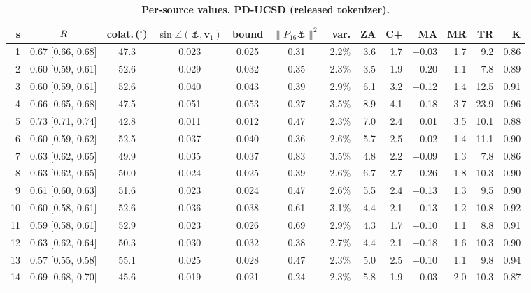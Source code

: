 \begin{table}[p]
\renewcommand{\baselinestretch}{1}
\caption{{\bf Per-source values, PD-UCSD (released tokenizer).}}
\label{tab:supp-pd_ucsd}
\centering\scriptsize
\setlength{\tabcolsep}{2.5pt}
\begin{tabular}{rcccccrrrrrrr}
\toprule
\textbf{s} & $\bar{R}$ & \textbf{colat.}\,($^\circ$) & $\sin\angle(\anchor,\bm{v}_1)$ & \textbf{bound} & $\|P_{16}\anchor\|^2$ & \textbf{var.} & \textbf{ZA} & \textbf{C+} & \textbf{MA} & \textbf{MR} & \textbf{TR} & \textbf{K} \\
\midrule
1 & 0.67 [0.66, 0.68] & 47.3 & 0.023 & 0.025 & 0.31 & 2.2\% & 3.6 & 1.7 & $-$0.03 & 1.7 & 9.2 & 0.86 \\
2 & 0.60 [0.59, 0.61] & 52.6 & 0.029 & 0.032 & 0.35 & 2.3\% & 3.5 & 1.9 & $-$0.20 & 1.1 & 7.8 & 0.89 \\
3 & 0.60 [0.59, 0.61] & 52.6 & 0.040 & 0.043 & 0.39 & 2.9\% & 6.1 & 3.2 & $-$0.12 & 1.4 & 12.5 & 0.91 \\
4 & 0.66 [0.65, 0.68] & 47.5 & 0.051 & 0.053 & 0.27 & 3.5\% & 8.9 & 4.1 & 0.18 & 3.7 & 23.9 & 0.96 \\
5 & 0.73 [0.71, 0.74] & 42.8 & 0.011 & 0.012 & 0.47 & 2.3\% & 7.0 & 2.4 & 0.01 & 3.5 & 10.1 & 0.88 \\
6 & 0.60 [0.59, 0.62] & 52.5 & 0.037 & 0.040 & 0.36 & 2.6\% & 5.7 & 2.5 & $-$0.02 & 1.4 & 11.1 & 0.90 \\
7 & 0.63 [0.62, 0.65] & 49.9 & 0.035 & 0.037 & 0.83 & 3.5\% & 4.8 & 2.2 & $-$0.09 & 1.3 & 7.8 & 0.86 \\
8 & 0.63 [0.62, 0.65] & 50.0 & 0.024 & 0.025 & 0.39 & 2.6\% & 6.7 & 2.7 & $-$0.26 & 1.8 & 10.3 & 0.90 \\
9 & 0.61 [0.60, 0.63] & 51.6 & 0.023 & 0.024 & 0.47 & 2.6\% & 5.5 & 2.4 & $-$0.13 & 1.3 & 9.5 & 0.90 \\
10 & 0.60 [0.58, 0.61] & 52.6 & 0.036 & 0.038 & 0.61 & 3.1\% & 4.4 & 2.1 & $-$0.13 & 1.2 & 10.8 & 0.92 \\
11 & 0.59 [0.58, 0.61] & 52.9 & 0.023 & 0.026 & 0.69 & 2.9\% & 4.3 & 1.7 & $-$0.10 & 1.1 & 8.8 & 0.91 \\
12 & 0.63 [0.62, 0.64] & 50.3 & 0.030 & 0.032 & 0.38 & 2.7\% & 4.4 & 2.1 & $-$0.18 & 1.6 & 10.3 & 0.90 \\
13 & 0.57 [0.55, 0.58] & 55.1 & 0.025 & 0.028 & 0.47 & 2.3\% & 5.0 & 2.5 & $-$0.10 & 1.1 & 9.8 & 0.94 \\
14 & 0.69 [0.68, 0.70] & 45.6 & 0.019 & 0.021 & 0.24 & 2.3\% & 5.8 & 1.9 & 0.03 & 2.0 & 10.3 & 0.87 \\

\end{tabular}
\end{table}
